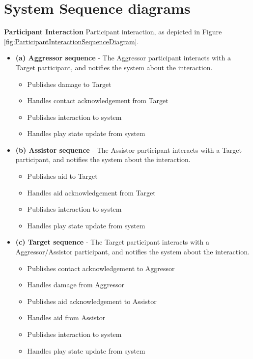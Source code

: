 \section{System Sequence diagrams}
\textbf{Participant Interaction}
\newline
Participant interaction, as depicted in Figure \ref{fig:ParticipantInteractionSequenceDiagram}.
\begin{itemize}
\item \textbf{(a) Aggressor sequence} - The Aggressor participant interacts with a Target participant, and notifies the system about the interaction.
   \begin{itemize}
     \item Publishes damage to Target
     \item Handles contact acknowledgement from Target
     \item Publishes interaction to system
     \item Handles play state update from system
   \end{itemize}
\item \textbf{(b) Assistor sequence} - The Assistor participant interacts with a Target participant, and notifies the system about the interaction.
   \begin{itemize}
     \item Publishes aid to Target
     \item Handles aid acknowledgement from Target
     \item Publishes interaction to system
     \item Handles play state update from system
   \end{itemize}
\item \textbf{(c) Target sequence} - The Target participant interacts with a Aggressor/Assistor participant, and notifies the system about the interaction.
   \begin{itemize}
     \item Publishes contact acknowledgement to Aggressor
     \item Handles damage from Aggressor
     \item Publishes aid acknowledgement to Assistor
     \item Handles aid from Assistor
     \item Publishes interaction to system
     \item Handles play state update from system
   \end{itemize}
\end{itemize}
